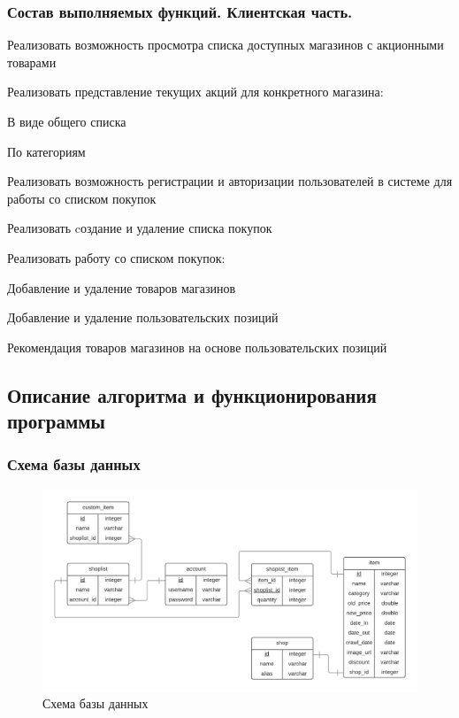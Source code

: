 \subsubsection{Состав выполняемых функций. Клиентская часть.}
\begin{my_enumerate}
  \item Реализовать возможность просмотра списка доступных магазинов с акционными товарами
  \item Реализовать представление текущих акций для конкретного магазина:
    \begin{my_enumerate}
      \item В виде общего списка
      \item По категориям
    \end{my_enumerate}
  \item Реализовать возможность регистрации и авторизации пользователей в системе для
    работы со списком покупок
  \item Реализовать cоздание и удаление списка покупок
  \item Реализовать работу со списком покупок:
    \begin{my_enumerate}
      \item Добавление и удаление товаров магазинов
      \item Добавление и удаление пользовательских позиций
      \item Рекомендация товаров магазинов на основе пользовательских позиций 
    \end{my_enumerate}
\end{my_enumerate}

\subsection{Описание алгоритма и функционирования программы}

\subsubsection{Схема базы данных}
\begin{figure}[h]
    \centering
    \includegraphics[width=\textwidth]{./pics/database.png}
    \caption{\small{Схема базы данных}}
    \label{database}
\end{figure}

